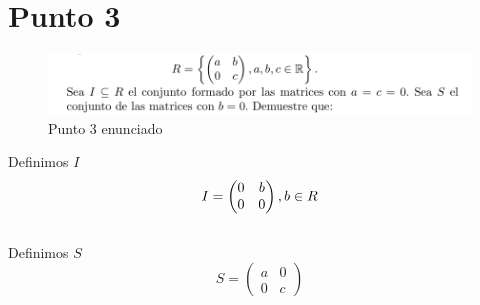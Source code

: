 \documentclass[10pt,a4paper]{article} %
\begin{document}
    \section{Punto 3}
        \begin{figure}[h!]
            \centering
            \includegraphics[width=0.8\linewidth]{punto2.png}
            \caption{Punto 3 enunciado}
            \label{fig}
        \end{figure}

        Definimos $ I  $
        \begin{equation}
            I = \begin{pmatrix}
                0 & b
                \\
                0 & 0
            \end{pmatrix}
            \\
             , b \in R
        \end{equation}
        \\
        Definimos $ S  $
        \begin{equation}
            S = \begin{pmatrix}
                a & 0
                \\
                0 & c
            \end{pmatrix}
        \end{equation}
\end{document}
